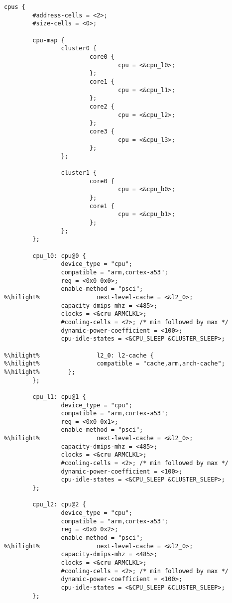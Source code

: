 \begin{lstlisting}[style=cstyle, escapechar=\%, caption=Modifications apportées au fichier \texttt{rk3399.dtsi}, label=annexe:cache]
cpus {
        #address-cells = <2>;
        #size-cells = <0>;

        cpu-map {
                cluster0 {
                        core0 {
                                cpu = <&cpu_l0>;
                        };
                        core1 {
                                cpu = <&cpu_l1>;
                        };
                        core2 {
                                cpu = <&cpu_l2>;
                        };
                        core3 {
                                cpu = <&cpu_l3>;
                        };
                };

                cluster1 {
                        core0 {
                                cpu = <&cpu_b0>;
                        };
                        core1 {
                                cpu = <&cpu_b1>;
                        };
                };
        };

        cpu_l0: cpu@0 {
                device_type = "cpu";
                compatible = "arm,cortex-a53";
                reg = <0x0 0x0>;
                enable-method = "psci";
%\hilight%                next-level-cache = <&l2_0>;
                capacity-dmips-mhz = <485>;
                clocks = <&cru ARMCLKL>;
                #cooling-cells = <2>; /* min followed by max */
                dynamic-power-coefficient = <100>;
                cpu-idle-states = <&CPU_SLEEP &CLUSTER_SLEEP>;

%\hilight%                l2_0: l2-cache {
%\hilight%                compatible = "cache,arm,arch-cache";
%\hilight%        };
        };

        cpu_l1: cpu@1 {
                device_type = "cpu";
                compatible = "arm,cortex-a53";
                reg = <0x0 0x1>;
                enable-method = "psci";
%\hilight%                next-level-cache = <&l2_0>;
                capacity-dmips-mhz = <485>;
                clocks = <&cru ARMCLKL>;
                #cooling-cells = <2>; /* min followed by max */
                dynamic-power-coefficient = <100>;
                cpu-idle-states = <&CPU_SLEEP &CLUSTER_SLEEP>;
        };

        cpu_l2: cpu@2 {
                device_type = "cpu";
                compatible = "arm,cortex-a53";
                reg = <0x0 0x2>;
                enable-method = "psci";
%\hilight%                next-level-cache = <&l2_0>;
                capacity-dmips-mhz = <485>;
                clocks = <&cru ARMCLKL>;
                #cooling-cells = <2>; /* min followed by max */
                dynamic-power-coefficient = <100>;
                cpu-idle-states = <&CPU_SLEEP &CLUSTER_SLEEP>;
        };


\end{lstlisting}
